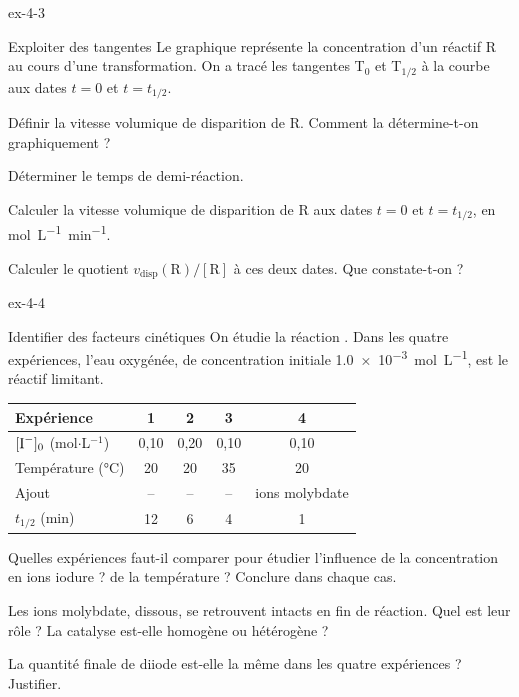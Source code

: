 \begin{blocLivre}{ex-4-3}
\begin{exercice}[1]{Exploiter des tangentes}
Le graphique représente la concentration d'un réactif R au cours d'une transformation. On a tracé les tangentes
T$_0$ et T$_{1/2}$ à la courbe aux dates $t=0$ et $t=t_{1/2}$.
\begin{questions}
\item Définir la vitesse volumique de disparition de R. Comment la détermine-t-on graphiquement ?
\item Déterminer le temps de demi-réaction.
\item Calculer la vitesse volumique de disparition de R aux dates $t=0$ et $t=t_{1/2}$, en \unit{mol.L^{-1}.min^{-1}}.
\item Calculer le quotient $v_\mathrm{disp}(\mathrm{R})/[\mathrm{R}]$ à ces deux dates. Que constate-t-on ?
\end{questions}
\end{exercice}
\end{blocLivre}
\begin{blocLivre}{ex-4-4}
\begin{exercice}[1]{Identifier des facteurs cinétiques}
On étudie la réaction . Dans les quatre expériences, l'eau oxygénée, de
concentration initiale \qty{1,0e-3}{mol.L^{-1}}, est le réactif limitant.
\begin{center}\small\renewcommand{\arraystretch}{1.2}
\begin{tabular}{@{}l*{4}{c}@{}}\toprule
Expérience & 1 & 2 & 3 & 4\\\midrule
$[\ce{I-}]_0$ (mol$\cdot$L$^{-1}$) & 0,10 & 0,20 & 0,10 & 0,10\\
Température (°C) & 20 & 20 & 35 & 20\\
Ajout & -- & -- & -- & ions molybdate\\
$t_{1/2}$ (min) & 12 & 6 & 4 & 1\\\bottomrule
\end{tabular}\end{center}
\begin{questions}
\item Quelles expériences faut-il comparer pour étudier l'influence de la concentration en ions iodure ? de la
température ? Conclure dans chaque cas.
\item Les ions molybdate, dissous, se retrouvent intacts en fin de réaction. Quel est leur rôle ? La catalyse est-elle
homogène ou hétérogène ?
\item La quantité finale de diiode est-elle la même dans les quatre expériences ? Justifier.
\end{questions}
\end{exercice}
\end{blocLivre}
